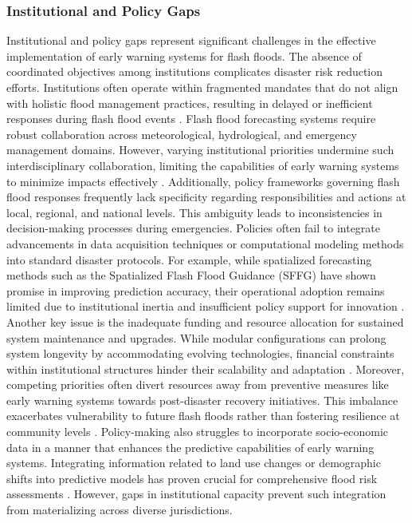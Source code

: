 \subsubsection{Institutional and Policy Gaps}
Institutional and policy gaps represent significant challenges in the effective implementation of early warning systems for flash floods. The absence of coordinated objectives among institutions complicates disaster risk reduction efforts. Institutions often operate within fragmented mandates that do not align with holistic flood management practices, resulting in delayed or inefficient responses during flash flood events \citep{Borga2019}.
Flash flood forecasting systems require robust collaboration across meteorological, hydrological, and emergency management domains. However, varying institutional priorities undermine such interdisciplinary collaboration, limiting the capabilities of early warning systems to minimize impacts effectively \citep{Martinaitis2023}.
Additionally, policy frameworks governing flash flood responses frequently lack specificity regarding responsibilities and actions at local, regional, and national levels. This ambiguity leads to inconsistencies in decision-making processes during emergencies. Policies often fail to integrate advancements in data acquisition techniques or computational modeling methods into standard disaster protocols. For example, while spatialized forecasting methods such as the Spatialized Flash Flood Guidance (SFFG) have shown promise in improving prediction accuracy, their operational adoption remains limited due to institutional inertia and insufficient policy support for innovation \citep{Douinot2016}\citep{Msigwa2024}.
Another key issue is the inadequate funding and resource allocation for sustained system maintenance and upgrades. While modular configurations can prolong system longevity by accommodating evolving technologies, financial constraints within institutional structures hinder their scalability and adaptation \citep{Georgakakos2022}. Moreover, competing priorities often divert resources away from preventive measures like early warning systems towards post-disaster recovery initiatives. This imbalance exacerbates vulnerability to future flash floods rather than fostering resilience at community levels \citep{Zhang2024}.
Policy-making also struggles to incorporate socio-economic data in a manner that enhances the predictive capabilities of early warning systems. Integrating information related to land use changes or demographic shifts into predictive models has proven crucial for comprehensive flood risk assessments \citep{Abegaz2024}. However, gaps in institutional capacity prevent such integration from materializing across diverse jurisdictions.
